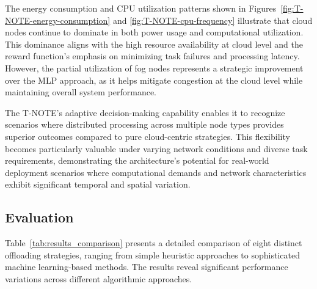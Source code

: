\documentclass[preprint,12pt]{elsarticle}
\begin{document}
The energy consumption and CPU utilization patterns shown in Figures~\ref{fig:T-NOTE-energy-consumption} and \ref{fig:T-NOTE-cpu-frequency} illustrate that cloud nodes continue to dominate in both power usage and computational utilization. This dominance aligns with the high resource availability at cloud level and the reward function's emphasis on minimizing task failures and processing latency. However, the partial utilization of fog nodes represents a strategic improvement over the MLP approach, as it helps mitigate congestion at the cloud level while maintaining overall system performance.

The T-NOTE's adaptive decision-making capability enables it to recognize scenarios where distributed processing across multiple node types provides superior outcomes compared to pure cloud-centric strategies. This flexibility becomes particularly valuable under varying network conditions and diverse task requirements, demonstrating the architecture's potential for real-world deployment scenarios where computational demands and network characteristics exhibit significant temporal and spatial variation.



\subsection{Evaluation}

Table~\ref{tab:results_comparison} presents a detailed comparison of eight distinct offloading strategies, ranging from simple heuristic approaches to sophisticated machine learning-based methods. The results reveal significant performance variations across different algorithmic approaches.
\end{document}
